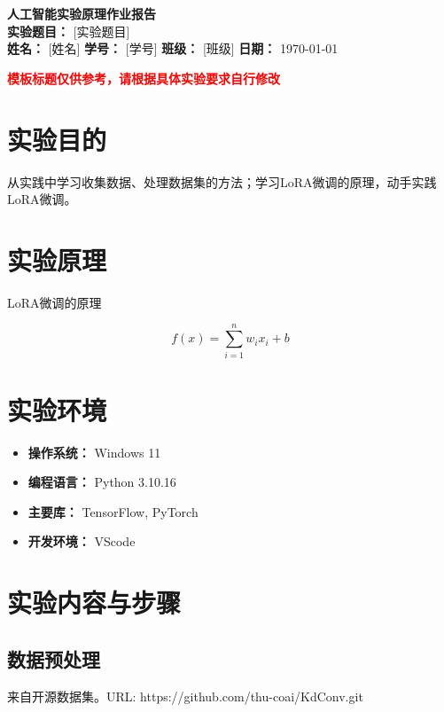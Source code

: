 \documentclass[a4paper,11pt]{article}
\begin{document}
\begin{center}
    {\LARGE \textbf{人工智能实验原理作业报告}} \\[0.3cm]
    {\Large \textbf{实验题目：} [实验题目] } \\[0.2cm]
    \textbf{姓名：} [姓名] \quad \textbf{学号：} [学号] \quad \textbf{班级：} [班级] \quad \textbf{日期：} \today
\end{center}

\begin{center}
\makebox[\textwidth]{\dotfill}
\end{center}

{\noindent \Large \textbf{\textcolor{red}{模板标题仅供参考，请根据具体实验要求自行修改}}}

\section{实验目的}

从实践中学习收集数据、处理数据集的方法；学习LoRA微调的原理，动手实践LoRA微调。

\section{实验原理}
LoRA微调的原理

\begin{equation}
    f(x) = \sum_{i=1}^{n} w_i x_i + b
\end{equation}

\section{实验环境}
\begin{itemize}
    \item \textbf{操作系统：} Windows 11 
    \item \textbf{编程语言：} Python 3.10.16
    \item \textbf{主要库：} TensorFlow, PyTorch
    \item \textbf{开发环境：} VScode
\end{itemize}

\section{实验内容与步骤}
\subsection{数据预处理}
来自开源数据集。URL: https://github.com/thu-coai/KdConv.git
\end{document}
